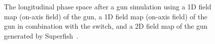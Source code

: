 \begin{figure}[tb]
\centering
{}
 \caption{The longitudinal phase space after a gun simulation using a 1D field map (on-axis field) of the gun, a 1D field map
   (on-axis field) of the gun in combination with the  switch, and a 2D field map of the gun generated by
   Superfish~\cite{superfish}.}
\label{fig:fieldnoiseexample}

\end{figure}


\clearpage
